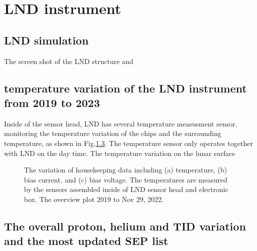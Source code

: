 \chapter{LND instrument}
\label{chp:LNDinstrument}

\section{LND simulation}
\label{chp:LNDsimulation}
The screen shot of the LND structure and 

\section{temperature variation of the LND instrument from 2019 to 2023}

Inside of the sensor head, LND has several temperature measusment sensor, monitoring the temperature variation of the chips and the surrounding temperature, as shown in Fig.\ref{}. The temperature sensor only operates together with LND on the day time. 
The temperature variation on the lunar surface

\begin{figure}
    \centering
    \caption[LND temperature, bias current, and bias voltage variations]{The variation of housekeeping data including (a) temperature, (b) bias current, and (c) bias voltage. The temperatures are measured by the sensors assembled inside of LND sensor head and electronic box. The overview plot  2019 to Nov 29, 2022. }
    \label{Fig:appendix_LND_Housekeeping}
\end{figure}

\section{The overall proton, helium and TID variation and the most updated SEP list}

